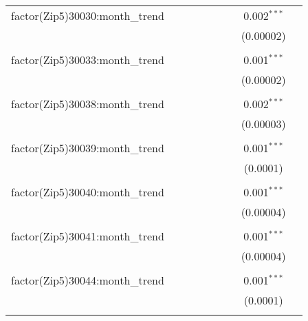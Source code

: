 \begin{table}[H]
{\begin{tabular}{@{\extracolsep{5pt}}lcccccccc}
  factor(Zip5)30030:month\_trend &  &  &  &  &  &  & 0.002$^{***}$ &  \\  

   &  &  &  &  &  &  & (0.00002) &  \\  

   & & & & & & & & \\  

  factor(Zip5)30033:month\_trend &  &  &  &  &  &  & 0.001$^{***}$ &  \\  

   &  &  &  &  &  &  & (0.00002) &  \\  

   & & & & & & & & \\  

  factor(Zip5)30038:month\_trend &  &  &  &  &  &  & 0.002$^{***}$ &  \\  

   &  &  &  &  &  &  & (0.00003) &  \\  

   & & & & & & & & \\  

  factor(Zip5)30039:month\_trend &  &  &  &  &  &  & 0.001$^{***}$ &  \\  

   &  &  &  &  &  &  & (0.0001) &  \\  

   & & & & & & & & \\  

  factor(Zip5)30040:month\_trend &  &  &  &  &  &  & 0.001$^{***}$ &  \\  

   &  &  &  &  &  &  & (0.00004) &  \\  

   & & & & & & & & \\  

  factor(Zip5)30041:month\_trend &  &  &  &  &  &  & 0.001$^{***}$ &  \\  

   &  &  &  &  &  &  & (0.00004) &  \\  

   & & & & & & & & \\  

  factor(Zip5)30044:month\_trend &  &  &  &  &  &  & 0.001$^{***}$ &  \\  

   &  &  &  &  &  &  & (0.0001) &  \\  

   & & & & & & & & \\  


\end{tabular}}
\end{table}
